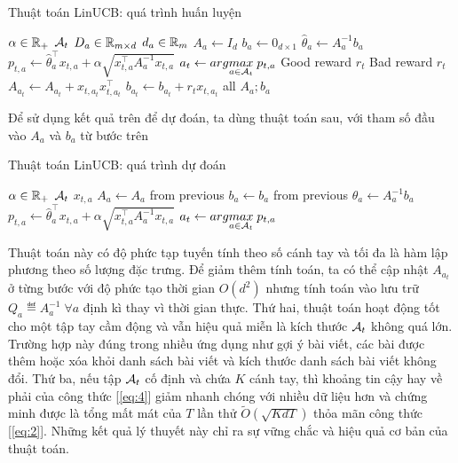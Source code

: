 \documentclass[14pt,oneside]{scrbook}
\begin{document}
\begin{algorithm}[H]
\caption{Thuật toán LinUCB: quá trình huấn luyện}
\begin{algorithmic}[1]
\Require $\alpha \in \mathbb{R}_+$
\Require $\mathcal{A}_t$
\Require $D_a \in \mathbb{R}_{m \times d}$
\Require $d_a \in \mathbb{R}_{m}$
    \State $A_a \leftarrow I_d$
    \State $b_a \leftarrow 0_{d \times 1}$
\EndFor
{}
            \State $\hat{\theta}_a \leftarrow A_a^{-1} b_a$
            \State $p_{t,a} \leftarrow \hat{\theta}_a^\top x_{t,a} + \alpha \sqrt{x_{t,a}^\top A_a^{-1} x_{t,a}}$
        \EndFor
        \State $a_t \leftarrow arg\underset{a\in\mathcal{A}_t}{max}\;p_{t,a}$
            \State Good reward $r_t$
        \Else
            \State Bad reward $r_t$
        \EndIf
        \State $A_{a_t} \leftarrow A_{a_t} + x_{t,a_t} x_{t,a_t}^\top$
        \State $b_{a_t} \leftarrow b_{a_t} + r_t x_{t,a_t}$
    \EndFor    
\EndFor
\State \Return all $A_a; b_a$
\end{algorithmic}
\end{algorithm}

Để sử dụng kết quả trên để dự đoán, ta dùng thuật toán sau, với tham số
đầu vào \(A_a\) và \(b_a\) từ bước trên

\begin{algorithm}[H]
\caption{Thuật toán LinUCB: quá trình dự đoán}
\begin{algorithmic}[1]
\Require $\alpha \in \mathbb{R}_+$
\Require $\mathcal{A}_t$
\Require $x_{t,a}$
    \State $A_a \leftarrow A_a $ from previous
    \State $b_a \leftarrow b_a $ from previous
\EndFor
{}
    \State $\hat{\theta}_a \leftarrow A_a^{-1} b_a$
    \State $p_{t,a} \leftarrow \hat{\theta}_a^\top x_{t,a} + \alpha \sqrt{x_{t,a}^\top A_a^{-1} x_{t,a}}$
\EndFor
\State \Return $a_t \leftarrow arg\underset{a\in\mathcal{A}_t}{max}\;p_{t,a}$
\end{algorithmic}
\end{algorithm}

Thuật toán này có độ phức tạp tuyến tính theo số cánh tay và tối đa là
hàm lập phương theo số lượng đặc trưng. Để giảm thêm tính toán, ta có
thể cập nhật \(A_{a_t}\) ở từng bước với độ phức tạo thời gian
\(O(d^2)\) nhưng tính toán vào lưu trữ \(Q_a\eqdef A^{-1}_a\;\forall a\)
định kì thay vì thời gian thực. Thứ hai, thuật toán hoạt động tốt cho
một tập tay cầm động và vẫn hiệu quả miễn là kích thước \(\mathcal{A}_t\) không
quá lớn. Trường hợp này đúng trong nhiều ứng dụng như gợi ý bài viết,
các bài được thêm hoặc xóa khỏi danh sách bài viết và kích thước danh
sách bài viết không đổi. Thứ ba, nếu tập \(\mathcal{A}_t\) cố định và chứa \(K\)
cánh tay, thì khoảng tin cậy hay về phải của công thức {[}\ref{eq:4}{]}
giảm nhanh chóng với nhiều dữ liệu hơn và chứng minh được là tổng mất
mát của \(T\) lần thử \(\tilde{O}\left(\sqrt{KdT}\right)\) thỏa mãn công
thức {[}\ref{eq:2}{]}. Những kết quả lý thuyết này chỉ ra sự vững chắc
và hiệu quả cơ bản của thuật toán.
\end{document}
